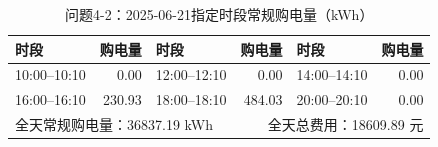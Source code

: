 \begin{table}[H]\centering\small
\caption{问题4-2：2025-06-21指定时段常规购电量（kWh）}
\label{tab:q4_2_0621_purchase}
\begin{tabular}{lrlrlr}\toprule
时段 & 购电量 & 时段 & 购电量 & 时段 & 购电量 \\\midrule
10:00--10:10 & 0.00 & 12:00--12:10 & 0.00 & 14:00--14:10 & 0.00 \\
16:00--16:10 & 230.93 & 18:00--18:10 & 484.03 & 20:00--20:10 & 0.00 \\
\midrule
\multicolumn{3}{l}{全天常规购电量：36837.19 kWh} & \multicolumn{3}{r}{全天总费用：18609.89 元}\\
\bottomrule\end{tabular}\end{table}

